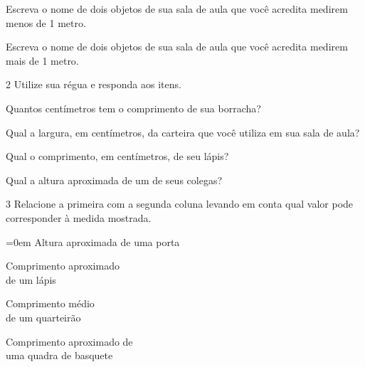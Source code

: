 \begin{escolha}
\item Escreva o nome de dois objetos de sua sala de aula que você acredita
  medirem menos de 1 metro.

\item Escreva o nome de dois objetos de sua sala de aula que você acredita
  medirem mais de 1 metro.
\end{escolha}

\num{2} Utilize sua régua e responda aos itens.

\begin{escolha}
\item Quantos centímetros tem o comprimento de sua borracha?

\item Qual a largura, em centímetros, da carteira que você utiliza em sua sala de aula?

\item Qual o comprimento, em centímetros, de seu lápis?

\item Qual a altura aproximada de um de seus colegas?
\end{escolha}


\num{3} Relacione a primeira com a segunda coluna levando em conta qual valor
pode corresponder à medida mostrada.

\begin{multicols}{2}\parindent=0em
Altura aproximada de uma porta\bigskip

Comprimento aproximado\\
de um lápis\bigskip

Comprimento médio\\
de um quarteirão\bigskip

Comprimento aproximado de\\
uma quadra de basquete

\columnbreak

\blue{20 cm}\bigskip

\bigskip

\bigskip

\end{multicols}


